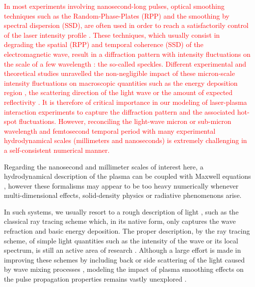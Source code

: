 \documentclass[%
 reprint,
 amsmath,amssymb,
 aps,
]{revtex4-1}
\begin{document}
\textcolor{red}{
In most experiments involving  nanosecond-long pulses, optical smoothing techniques  such as the Random-Phase-Plates (RPP) and the smoothing by spectral dispersion (SSD), are often used in order to reach a satisfactorily control of the laser intensity profile \cite{Kato_1984}.
These techniques, which usually  consist in degrading the spatial (RPP) and temporal coherence (SSD) of the electromagnetic wave,  result in a diffraction pattern  with intensity fluctuations on the scale of a few wavelength : the so-called speckles. 
Different experimental and theoretical studies unravelled the non-negligible impact of these micron-scale intensity fluctuations on macroscopic quantities such as the energy deposition region  \cite[]{POP_Delamater_1996,Huser_2009}, the scattering direction  of the light wave \cite{Epstein_1986,PRL_Moody_96,POP_Debayle_2018,POP_Duluc_2019,Yin_2019,POP_Huller_2020} or the amount of expected reflectivity \cite[]{POP_Laffite_2010,PRL_Rousseaux_2016,POP_Masson_2016,Glize_2017,Winjum_2019}.
It is therefore of critical importance in our modeling of laser-plasma interaction experiments to capture the diffraction pattern and the associated hot-spot fluctuations. 
However, reconciling the light-wave micron or sub-micron wavelength and  femtosecond temporal period with many experimental  hydrodynamical scales  (millimeters and nanoseconds) is extremely challenging in a self-consistent numerical manner. }

Regarding the nanosecond and millimeter scales of interest here, a hydrodynamical description of the plasma can be coupled with Maxwell equations \cite{Berger_1995,Still_2006,Loiseau_2006, Huller_2006}, however these  formalisms may appear to be  too heavy numerically whenever  multi-dimensional effects,  solid-density physics or radiative phenomenons arise.

In such systems, we usually resort to a rough description of light \cite[]{POP_Zhang_2014,Lefebvre_2018},  such as the classical ray tracing scheme which, in its native form, only captures the wave refraction and basic energy deposition.
The proper description, by the ray tracing scheme,  of simple  light quantities  such as the intensity  of the wave or its local spectrum, is still an active area of research  \cite{Egorchenkov_2001, Colaitis_2014, Strozzi_2017}.
Although a large effort is made in improving these schemes by including back or side scattering of the light caused by wave mixing processes \cite[]{Strozzi_2017,POP_Debayle_2019},  
modeling the impact of plasma smoothing effects on the pulse propagation properties remains vastly unexplored \cite[]{POF_Anderson,POP_Still_2000,POP_Grech_2006,PRL_Grech_2009}.
\end{document}
